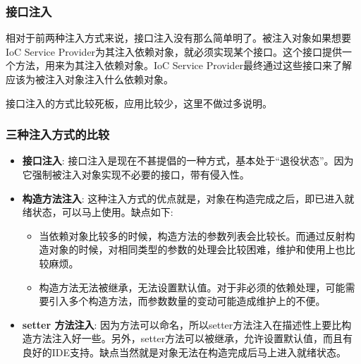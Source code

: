 \subsubsection*{接口注入}

相对于前两种注入方式来说，接口注入没有那么简单明了。被注入对象如果想要IoC  Service  Provider为其注入依赖对象，就必须实现某个接口。这个接口提供一个方法，用来为其注入依赖对象。IoC Service Provider最终通过这些接口来了解应该为被注入对象注入什么依赖对象。

接口注入的方式比较死板，应用比较少，这里不做过多说明。

\subsubsection*{三种注入方式的比较}

\begin{itemize}
    \item \textbf{接口注入}: 接口注入是现在不甚提倡的一种方式，基本处于“退役状态”。因为它强制被注入对象实现不必要的接口，带有侵入性。
    \item \textbf{构造方法注入}: 这种注入方式的优点就是，对象在构造完成之后，即已进入就绪状态，可以马上使用。缺点如下: 
        \begin{itemize}
            \item 当依赖对象比较多的时候，构造方法的参数列表会比较长。而通过反射构造对象的时候，对相同类型的参数的处理会比较困难，维护和使用上也比较麻烦。
            \item 构造方法无法被继承，无法设置默认值。对于非必须的依赖处理，可能需要引入多个构造方法，而参数数量的变动可能造成维护上的不便。
        \end{itemize}
    \item \textbf{setter 方法注入}: 因为方法可以命名，所以setter方法注入在描述性上要比构造方法注入好一些。另外，setter方法可以被继承，允许设置默认值，而且有良好的IDE支持。缺点当然就是对象无法在构造完成后马上进入就绪状态。
\end{itemize}

\newpage